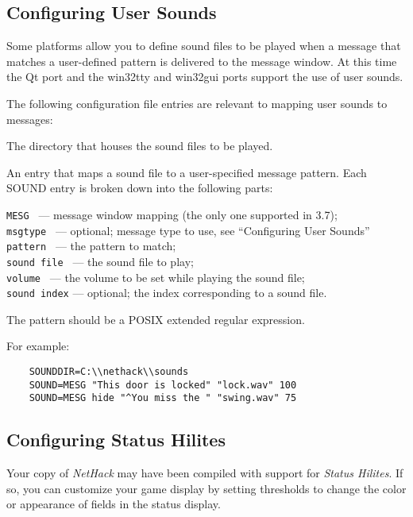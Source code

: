 \subsection*{Configuring User Sounds}

Some platforms allow you to define sound files to be played when a message
that matches a user-defined pattern is delivered to the message window.
At this time the Qt port and the win32tty and win32gui ports support the
use of user sounds.

The following configuration file entries are relevant to mapping user sounds
to messages:

\blist{}
\item[\ib{SOUNDDIR}]
The directory that houses the sound files to be played.
\item[\ib{SOUND}]
An entry that maps a sound file to a user-specified message pattern.
Each SOUND entry is broken down into the following parts:

{\tt MESG       } --- message window mapping (the only one supported in 3.7);\\
{\tt msgtype    } --- optional; message type to use, see ``Configuring User Sounds''\\
{\tt pattern    } --- the pattern to match;\\
{\tt sound file } --- the sound file to play;\\
{\tt volume     } --- the volume to be set while playing the sound file;\\
{\tt sound index} --- optional; the index corresponding to a sound file.
\elist

The pattern should be a POSIX extended regular expression.

For example:

\begin{verbatim}
    SOUNDDIR=C:\\nethack\\sounds
    SOUND=MESG "This door is locked" "lock.wav" 100
    SOUND=MESG hide "^You miss the " "swing.wav" 75
\end{verbatim}

\subsection*{Configuring Status Hilites}

Your copy of {\it NetHack\/} may have been compiled with support
for {\it Status Hilites}.
If so, you can customize your game display by setting thresholds to
change the color or appearance of fields in the status display.

